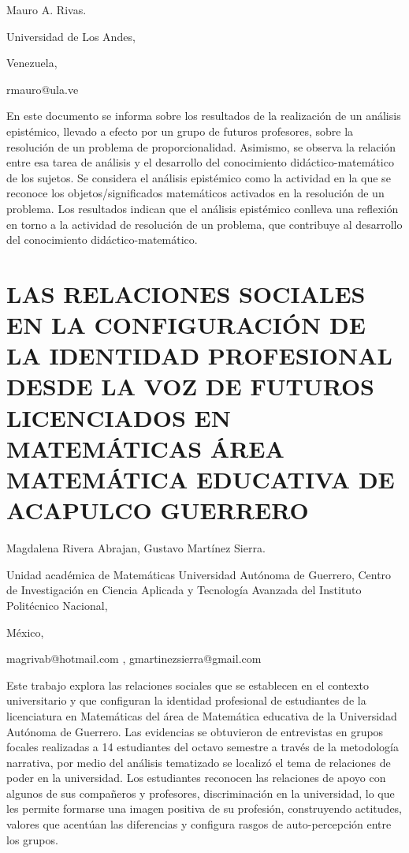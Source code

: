 \begin{datos}

Mauro A. Rivas.

Universidad de Los Andes,

Venezuela,

rmauro@ula.ve

\end{datos}

En este documento se informa sobre los resultados de la realización
de un análisis epistémico, llevado a efecto por un grupo de futuros
profesores, sobre la resolución de un problema de proporcionalidad.
Asimismo, se observa la relación entre esa tarea de análisis y el
desarrollo del conocimiento didáctico-matemático de los sujetos. Se
considera el análisis epistémico como la actividad en la que se reconoce
los objetos/significados matemáticos activados en la resolución de
un problema. Los resultados indican que el análisis epistémico conlleva
una reflexión en torno a la actividad de resolución de un problema,
que contribuye al desarrollo del conocimiento didáctico-matemático. 


\section{LAS RELACIONES SOCIALES EN LA CONFIGURACIÓN DE LA IDENTIDAD PROFESIONAL
DESDE LA VOZ DE FUTUROS LICENCIADOS EN MATEMÁTICAS ÁREA MATEMÁTICA
EDUCATIVA DE ACAPULCO GUERRERO}

\begin{datos}

Magdalena Rivera Abrajan, Gustavo Martínez Sierra.

Unidad académica de Matemáticas Universidad Autónoma de Guerrero,
Centro de Investigación en Ciencia Aplicada y Tecnología Avanzada
del Instituto Politécnico Nacional,

México,

magrivab@hotmail.com , gmartinezsierra@gmail.com

\end{datos}

Este trabajo explora las relaciones sociales que se establecen en
el contexto universitario y que configuran la identidad profesional
de estudiantes de la licenciatura en Matemáticas del área de Matemática
educativa de la Universidad Autónoma de Guerrero. Las evidencias se
obtuvieron de entrevistas en grupos focales realizadas a 14 estudiantes
del octavo semestre a través de la metodología narrativa, por medio
del análisis tematizado se localizó el tema de relaciones de poder
en la universidad. Los estudiantes reconocen las relaciones de apoyo
con algunos de sus compañeros y profesores, discriminación en la universidad,
lo que les permite formarse una imagen positiva de su profesión, construyendo
actitudes, valores que acentúan las diferencias y configura rasgos
de auto-percepción entre los grupos.


